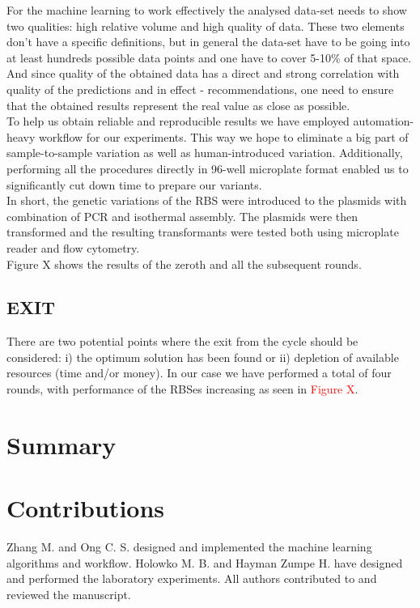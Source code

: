 \documentclass{article}
\begin{document}
For the machine learning to work effectively the analysed data-set needs to show two qualities: high relative volume and high quality of data.
These two elements don't have a specific definitions, but in general the data-set have to be going into at least hundreds possible data points and one have to cover 5-10\% of that space.
And since quality of the obtained data has a direct and strong correlation with quality of the predictions and in effect - recommendations, one need to ensure that the obtained results represent the real value as close as possible.\\
To help us obtain reliable and reproducible results we have employed automation-heavy workflow for our experiments.
This way we hope to eliminate a big part of sample-to-sample variation as well as human-introduced variation.
Additionally, performing all the procedures directly in 96-well microplate format enabled us to significantly cut down time to prepare our variants.\\
In short, the genetic variations of the RBS were introduced to the plasmids with combination of PCR and isothermal assembly.
The plasmids were then transformed and the resulting transformants were tested both using microplate reader and flow cytometry.\\
Figure X shows the results of the zeroth and all the subsequent rounds.\\

\subsection{EXIT}
There are two potential points where the exit from the cycle should be considered: i) the optimum solution has been found or ii) depletion of available resources (time and/or money). In our case we have performed a total of four rounds, with performance of the RBSes increasing as seen in \textcolor{red}{Figure X}.\\

\section{Summary}

\section{Contributions}
Zhang M. and Ong C. S. designed and implemented the machine learning algorithms and workflow. Holowko M. B. and Hayman Zumpe H. have designed and performed the laboratory experiments. All authors contributed to and reviewed the manuscript.


\newpage

\printbibliography

\clearpage

\appendix

\end{document}
